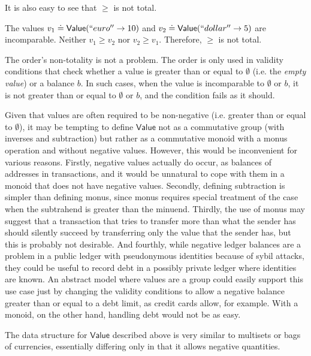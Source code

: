 \documentclass{llncs}
\newcommand{\expeq}{\doteq}
\newcommand{\type}[1]{\mathsf{#1}}
\newcommand{\valueT}{\type{Value}}
\begin{document}
It is also easy to see that $\ge$ is not total.

\begin{example}
The values $v_1 \expeq \valueT(``euro'' \rightarrow 10)$ and $v_2 \expeq \valueT(``dollar'' \rightarrow 5)$ are incomparable. Neither $v_1 \ge v_2$ nor $v_2 \ge v_1$. Therefore, $\ge$ is not total.
\end{example}

The order's non-totality is not a problem. The order is only used in validity conditions that check whether a value is greater than or equal to $\emptyset$ (i.e. the \emph{empty value}) or a balance $b$. In such cases, when the value is incomparable to $\emptyset$ or $b$, it is not greater than or equal to $\emptyset$ or $b$, and the condition fails as it should.

Given that values are often required to be non-negative (i.e. greater than or equal to $\emptyset$), it may be tempting to define $\valueT$ not as a commutative group (with inverses and subtraction) but rather as a commutative monoid with a monus operation and without negative values. However, this would be inconvenient for various reasons. Firstly, negative values actually do occur, as balances of addresses in transactions, and it would be unnatural to cope with them in a monoid that does not have negative values. Secondly, defining subtraction is simpler than defining monus, since monus requires special treatment of the case when the subtrahend is greater than the minuend. Thirdly, the use of monus may suggest that a transaction that tries to transfer more than what the sender has should silently succeed by transferring only the value that the sender has, but this is probably not desirable. And fourthly, while negative ledger balances are a problem in a public ledger with pseudonymous identities because of sybil attacks, they could be useful to record debt in a possibly private ledger where identities are known. An abstract model where values are a group could easily support this use case just by changing the validity conditions to allow a negative balance greater than or equal to a debt limit,
as credit cards allow, for example. With a monoid, on the other hand, handling debt would not be as easy.

The data structure for $\valueT$ described above is very similar to multisets or bags of currencies, essentially differing only in that it allows negative quantities.
\end{document}
